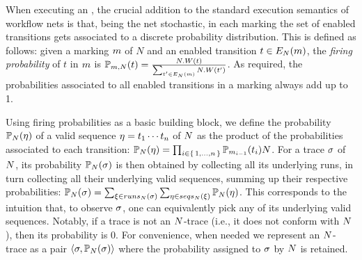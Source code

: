 When executing an \uswn, the crucial addition to the standard execution semantics of workflow nets is that, being the net stochastic, in each marking the set of enabled transitions gets associated to a discrete probability distribution. This is defined as follows: given a marking $\marking$ of $N$ and an enabled transition $t \in \enaset{\marking}{\net}$, the \emph{firing probability} of $t$ in $\marking$ is $\probt{t}{\marking}{\net} = \frac{\net.W(t)}{\sum_{t'\in \enaset{\marking}{\net}}\net.W(t')}$. As required, the probabilities associated to all enabled transitions in a marking always add up to 1.

Using firing probabilities as a basic building block, we define the probability $\prob{\seq}{\net}$ of a valid sequence $\seq = t_1\cdots t_n$ of $\net$ as the product of the probabilities associated to each transition: $\prob{\seq}{\net} = \prod_{i \in \set{1,\ldots,n}}\prob{t_i}{\marking_{i-1}}{\net}$. %
For a trace $\trace$ of $\net$, its probability $\prob{\trace}{\net}$ is then obtained by collecting all its underlying runs, in turn collecting all their underlying valid sequences, summing up their respective probabilities: $\prob{\trace}{\net} = \sum_{\run \in \runs{\trace}{\net}} \sum_{\seq \in \seqs{\run}{\net}} \prob{\seq}{\net}$. This corresponds to the intuition that, to observe $\trace$, one can equivalently pick any of its underlying valid sequences. Notably, if a trace is not an $\net$-trace (i.e., it does not conform with $\net$), then its probability is 0. For convenience, when needed we represent an $\net$-trace as a pair $\tup{\trace,\prob{\trace}{\net}}$ where the probability assigned to $\trace$ by $\net$ is retained.
